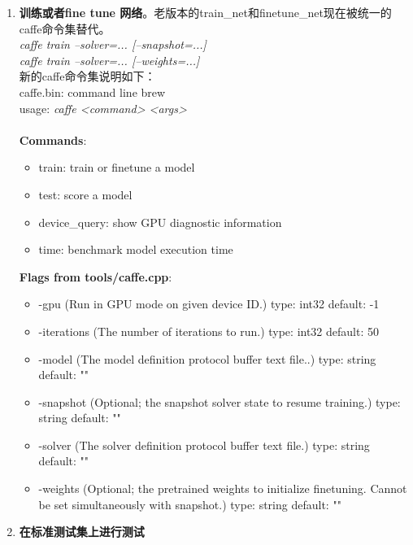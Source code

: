 \documentclass{article}
\begin{document}
\begin{CJK}{UTF8}{gbsn}
\begin{enumerate}
    \item \textbf{训练或者fine tune 网络}。老版本的train\_net和finetune\_net现在被统一的caffe命令集替代。\\
       \textit{ caffe train --solver=... [--snapshot=...]}\\
       \textit{ caffe train --solver=... [--weights=...]}\\
       新的caffe命令集说明如下：\\
       caffe.bin: command line brew \\
       usage: \textit{ caffe <command> <args>} \\
       \\
       \textbf{Commands}:\\
       \begin{itemize}
        \item train:  train or finetune a model
        \item test:   score a model
        \item device\_query: show GPU diagnostic information
        \item time:  benchmark model execution time        
       \end{itemize}
       \textbf{ Flags from tools/caffe.cpp}:
       \begin{itemize}
        \item -gpu (Run in GPU mode on given device ID.) type: int32 default: -1
        \item -iterations (The number of iterations to run.) type: int32 default: 50
        \item -model (The model definition protocol buffer text file..) type: string default: ""
        \item -snapshot (Optional; the snapshot solver state to resume training.) type: string default: ""
        \item -solver (The solver definition protocol buffer text file.) type: string default: ""
        \item  -weights (Optional; the pretrained weights to initialize finetuning. Cannot be set simultaneously with snapshot.) type: string default: ""
        \end{itemize}
        
     \item \textbf{在标准测试集上进行测试}


\end{enumerate}
\end{CJK}
\end{document}
